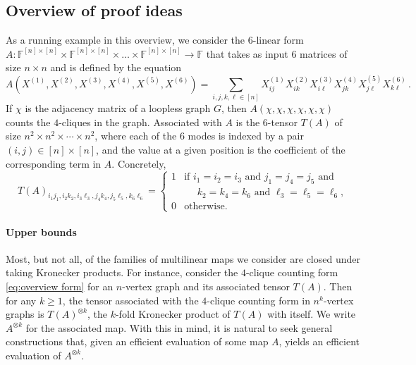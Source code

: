 \documentclass[11pt]{article}
\numberwithin{equation}{section}
\theoremstyle{definition}
\theoremstyle{plain}
\newcommand{\F}{\ensuremath{\mathbb{F}}}
\begin{document}
\subsection{Overview of proof ideas}

\label{sect:ideas}

As a running example in this overview, we consider the $6$-linear
%
%
form  %
$A: \F^{[n] \times [n]} \times \F^{[n] \times [n]} \times \ldots
\times \F^{[n] \times [n]} \rightarrow \F$
%
%
that takes as input $6$ matrices of size $n \times n$ and is
defined by the equation  %
\begin{equation}
\label{eq:overview form}
A(X^{(1)}, X^{(2)}, X^{(3)}, X^{(4)}, X^{(5)}, X^{(6)}) = \sum_{i, j, k, \ell \in[n]} X^{(1)}_{ij} X^{(2)}_{ik} X^{(3)}_{i\ell} X^{(4)}_{jk} X^{(5)}_{j\ell} X^{(6)}_{k\ell}\,.
\end{equation}
If $\chi$ is the adjacency matrix of a loopless graph $G$, then $A(\chi, \chi, \chi, \chi, \chi,
\chi)$ counts the %
$4$-cliques in the graph.  Associated with $A$ is the $6$-tensor $T(A)$ of size $n^2 \times n^2 \times \cdots \times n^2$, where each of the $6$ modes is indexed by a pair $(i, j) \in [n] \times [n]$, 
and the value at a given position is the coefficient of the corresponding
term in $A$.  Concretely,
\[
%
%
%
%
%
T(A)_{i_1j_1, i_2k_2, i_3\ell_3, j_4k_4, j_5\ell_5, k_6\ell_6} =
\begin{cases}
  1 & \!\!\! \text{if $i_1 = i_2 = i_3$ and $j_1 = j_4 = j_5$ and}\\
  & \!\!\! \text{$\,\,\,\,\,\,\,\, k_2 = k_4 = k_6$ and $\ell_3 = \ell_5 = \ell_6$},\\
  0 & \!\!\! \text{otherwise}.
\end{cases}
\]

\paragraph*{Upper bounds}

Most, but not all, of the families of multilinear maps we consider are
closed under taking Kronecker products.  For instance, consider the
$4$-clique counting form \eqref{eq:overview form} for an $n$-vertex
graph and its associated tensor $T(A)$.  Then for any
$k \ge 1$, the tensor associated with the $4$-clique counting form in
$n^k$-vertex graphs is $T(A)^{\otimes k}$, the $k$-fold Kronecker
product of $T(A)$ with itself.  We write $A^{\otimes k}$ for the
associated map.  With this in mind, it is natural to seek general
constructions that, given an efficient evaluation
of some map $A$, yields an efficient evaluation of $A^{\otimes k}$.
\end{document}
